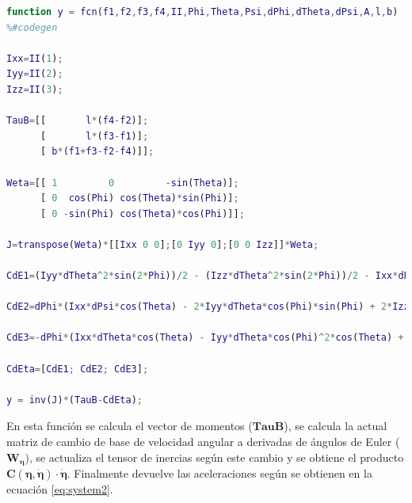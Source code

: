 \documentclass[twoside,11pt]{report}
\begin{document}
\singlespacing
\begin{lstlisting}[language=Matlab]
function y = fcn(f1,f2,f3,f4,II,Phi,Theta,Psi,dPhi,dTheta,dPsi,A,l,b)
%#codegen

Ixx=II(1);
Iyy=II(2);
Izz=II(3);
 
TauB=[[       l*(f4-f2)];
      [       l*(f3-f1)];
      [ b*(f1+f3-f2-f4)]];  

Weta=[[ 1         0         -sin(Theta)];
      [ 0  cos(Phi) cos(Theta)*sin(Phi)];
      [ 0 -sin(Phi) cos(Theta)*cos(Phi)]];
 
J=transpose(Weta)*[[Ixx 0 0];[0 Iyy 0];[0 0 Izz]]*Weta;  

CdE1=(Iyy*dTheta^2*sin(2*Phi))/2 - (Izz*dTheta^2*sin(2*Phi))/2 - Ixx*dPsi*dTheta*cos(Theta) - (Iyy*dPsi^2*sin(2*Phi)*cos(Theta)^2)/2 + (Izz*dPsi^2*sin(2*Phi)*cos(Theta)^2)/2 - Iyy*dPsi*dTheta*cos(2*Phi)*cos(Theta) + Izz*dPsi*dTheta*cos(2*Phi)*cos(Theta);

CdE2=dPhi*(Ixx*dPsi*cos(Theta) - 2*Iyy*dTheta*cos(Phi)*sin(Phi) + 2*Izz*dTheta*cos(Phi)*sin(Phi) + Iyy*dPsi*cos(Phi)^2*cos(Theta) - Izz*dPsi*cos(Phi)^2*cos(Theta) - Iyy*dPsi*cos(Theta)*sin(Phi)^2 + Izz*dPsi*cos(Theta)*sin(Phi)^2)  - Ixx*dPsi^2*cos(Theta)*sin(Theta) + Iyy*dPsi^2*cos(Theta)*sin(Phi)^2*sin(Theta)  + Izz*dPsi^2*cos(Phi)^2*cos(Theta)*sin(Theta);

CdE3=-dPhi*(Ixx*dTheta*cos(Theta) - Iyy*dTheta*cos(Phi)^2*cos(Theta) + Izz*dTheta*cos(Phi)^2*cos(Theta) + Iyy*dTheta*cos(Theta)*sin(Phi)^2 - Izz*dTheta*cos(Theta)*sin(Phi)^2 - 2*Iyy*dPsi*cos(Phi)*cos(Theta)^2*sin(Phi) + 2*Izz*dPsi*cos(Phi)*cos(Theta)^2*sin(Phi))  - Iyy*dTheta^2*cos(Phi)*sin(Phi)*sin(Theta) + Izz*dTheta^2*cos(Phi)*sin(Phi)*sin(Theta) + 2*Ixx*dPsi*dTheta*cos(Theta)*sin(Theta) - 2*Izz*dPsi*dTheta*cos(Phi)^2*cos(Theta)*sin(Theta) - 2*Iyy*dPsi*dTheta*cos(Theta)*sin(Phi)^2*sin(Theta);

CdEta=[CdE1; CdE2; CdE3];

y = inv(J)*(TauB-CdEta);
\end{lstlisting}
\onehalfspacing

En esta función se calcula el vector de momentos ($\mathbf{TauB}$), se calcula la actual matriz de cambio de base de velocidad angular a derivadas de ángulos de Euler ($\mathbf{W_\eta}$), se actualiza el tensor de inercias según este cambio y se obtiene el producto $\pmb{C(\eta,\dot{\eta})}\cdot\pmb{\dot{\eta}}$. Finalmente devuelve las aceleraciones según se obtienen en la ecuación \ref{eq:system2}.
\end{document}
